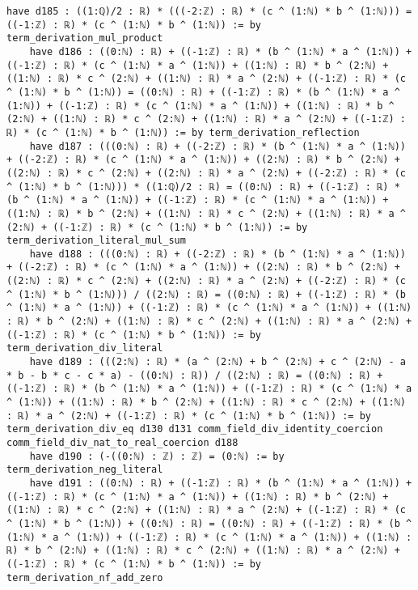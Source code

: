 \documentclass{article}
\begin{document}
\begin{tcolorbox}[colback=white!10, width=\linewidth]
\begin{lstlisting}[language=Lean4]
    have d185 : ((1:ℚ)/2 : ℝ) * (((-2:ℤ) : ℝ) * (c ^ (1:ℕ) * b ^ (1:ℕ))) = ((-1:ℤ) : ℝ) * (c ^ (1:ℕ) * b ^ (1:ℕ)) := by term_derivation_mul_product
    have d186 : ((0:ℕ) : ℝ) + ((-1:ℤ) : ℝ) * (b ^ (1:ℕ) * a ^ (1:ℕ)) + ((-1:ℤ) : ℝ) * (c ^ (1:ℕ) * a ^ (1:ℕ)) + ((1:ℕ) : ℝ) * b ^ (2:ℕ) + ((1:ℕ) : ℝ) * c ^ (2:ℕ) + ((1:ℕ) : ℝ) * a ^ (2:ℕ) + ((-1:ℤ) : ℝ) * (c ^ (1:ℕ) * b ^ (1:ℕ)) = ((0:ℕ) : ℝ) + ((-1:ℤ) : ℝ) * (b ^ (1:ℕ) * a ^ (1:ℕ)) + ((-1:ℤ) : ℝ) * (c ^ (1:ℕ) * a ^ (1:ℕ)) + ((1:ℕ) : ℝ) * b ^ (2:ℕ) + ((1:ℕ) : ℝ) * c ^ (2:ℕ) + ((1:ℕ) : ℝ) * a ^ (2:ℕ) + ((-1:ℤ) : ℝ) * (c ^ (1:ℕ) * b ^ (1:ℕ)) := by term_derivation_reflection
    have d187 : (((0:ℕ) : ℝ) + ((-2:ℤ) : ℝ) * (b ^ (1:ℕ) * a ^ (1:ℕ)) + ((-2:ℤ) : ℝ) * (c ^ (1:ℕ) * a ^ (1:ℕ)) + ((2:ℕ) : ℝ) * b ^ (2:ℕ) + ((2:ℕ) : ℝ) * c ^ (2:ℕ) + ((2:ℕ) : ℝ) * a ^ (2:ℕ) + ((-2:ℤ) : ℝ) * (c ^ (1:ℕ) * b ^ (1:ℕ))) * ((1:ℚ)/2 : ℝ) = ((0:ℕ) : ℝ) + ((-1:ℤ) : ℝ) * (b ^ (1:ℕ) * a ^ (1:ℕ)) + ((-1:ℤ) : ℝ) * (c ^ (1:ℕ) * a ^ (1:ℕ)) + ((1:ℕ) : ℝ) * b ^ (2:ℕ) + ((1:ℕ) : ℝ) * c ^ (2:ℕ) + ((1:ℕ) : ℝ) * a ^ (2:ℕ) + ((-1:ℤ) : ℝ) * (c ^ (1:ℕ) * b ^ (1:ℕ)) := by term_derivation_literal_mul_sum
    have d188 : (((0:ℕ) : ℝ) + ((-2:ℤ) : ℝ) * (b ^ (1:ℕ) * a ^ (1:ℕ)) + ((-2:ℤ) : ℝ) * (c ^ (1:ℕ) * a ^ (1:ℕ)) + ((2:ℕ) : ℝ) * b ^ (2:ℕ) + ((2:ℕ) : ℝ) * c ^ (2:ℕ) + ((2:ℕ) : ℝ) * a ^ (2:ℕ) + ((-2:ℤ) : ℝ) * (c ^ (1:ℕ) * b ^ (1:ℕ))) / ((2:ℕ) : ℝ) = ((0:ℕ) : ℝ) + ((-1:ℤ) : ℝ) * (b ^ (1:ℕ) * a ^ (1:ℕ)) + ((-1:ℤ) : ℝ) * (c ^ (1:ℕ) * a ^ (1:ℕ)) + ((1:ℕ) : ℝ) * b ^ (2:ℕ) + ((1:ℕ) : ℝ) * c ^ (2:ℕ) + ((1:ℕ) : ℝ) * a ^ (2:ℕ) + ((-1:ℤ) : ℝ) * (c ^ (1:ℕ) * b ^ (1:ℕ)) := by term_derivation_div_literal
    have d189 : (((2:ℕ) : ℝ) * (a ^ (2:ℕ) + b ^ (2:ℕ) + c ^ (2:ℕ) - a * b - b * c - c * a) - ((0:ℕ) : ℝ)) / ((2:ℕ) : ℝ) = ((0:ℕ) : ℝ) + ((-1:ℤ) : ℝ) * (b ^ (1:ℕ) * a ^ (1:ℕ)) + ((-1:ℤ) : ℝ) * (c ^ (1:ℕ) * a ^ (1:ℕ)) + ((1:ℕ) : ℝ) * b ^ (2:ℕ) + ((1:ℕ) : ℝ) * c ^ (2:ℕ) + ((1:ℕ) : ℝ) * a ^ (2:ℕ) + ((-1:ℤ) : ℝ) * (c ^ (1:ℕ) * b ^ (1:ℕ)) := by term_derivation_div_eq d130 d131 comm_field_div_identity_coercion comm_field_div_nat_to_real_coercion d188
    have d190 : (-((0:ℕ) : ℤ) : ℤ) = (0:ℕ) := by term_derivation_neg_literal
    have d191 : ((0:ℕ) : ℝ) + ((-1:ℤ) : ℝ) * (b ^ (1:ℕ) * a ^ (1:ℕ)) + ((-1:ℤ) : ℝ) * (c ^ (1:ℕ) * a ^ (1:ℕ)) + ((1:ℕ) : ℝ) * b ^ (2:ℕ) + ((1:ℕ) : ℝ) * c ^ (2:ℕ) + ((1:ℕ) : ℝ) * a ^ (2:ℕ) + ((-1:ℤ) : ℝ) * (c ^ (1:ℕ) * b ^ (1:ℕ)) + ((0:ℕ) : ℝ) = ((0:ℕ) : ℝ) + ((-1:ℤ) : ℝ) * (b ^ (1:ℕ) * a ^ (1:ℕ)) + ((-1:ℤ) : ℝ) * (c ^ (1:ℕ) * a ^ (1:ℕ)) + ((1:ℕ) : ℝ) * b ^ (2:ℕ) + ((1:ℕ) : ℝ) * c ^ (2:ℕ) + ((1:ℕ) : ℝ) * a ^ (2:ℕ) + ((-1:ℤ) : ℝ) * (c ^ (1:ℕ) * b ^ (1:ℕ)) := by term_derivation_nf_add_zero

\end{lstlisting}
\end{tcolorbox}
\end{document}
